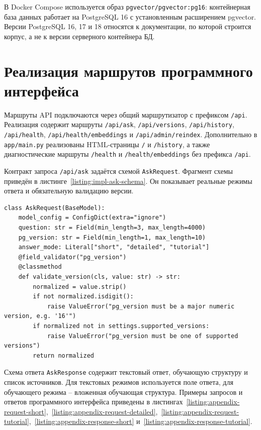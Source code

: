 В Docker Compose используется образ \texttt{pgvector/pgvector:pg16}: контейнерная база данных работает на PostgreSQL 16 с установленным расширением pgvector. Версии PostgreSQL 16, 17 и 18 относятся к документации, по которой строится корпус, а не к версии серверного контейнера БД.

\section{Реализация маршрутов программного интерфейса}

Маршруты API подключаются через общий маршрутизатор с префиксом \texttt{/api}. Реализация содержит маршруты \texttt{/api/ask}, \texttt{/api/versions}, \texttt{/api/history}, \texttt{/api/health}, \texttt{/api/health/embeddings} и \texttt{/api/admin/reindex}. Дополнительно в \texttt{app/main.py} реализованы HTML-страницы \texttt{/} и \texttt{/history}, а также диагностические маршруты \texttt{/health} и \texttt{/health/embeddings} без префикса \texttt{/api}.

Контракт запроса \texttt{/api/ask} задаётся схемой \texttt{AskRequest}. Фрагмент схемы приведён в листинге~\ref{listing:impl-ask-schema}. Он показывает реальные режимы ответа и обязательную валидацию версии.

\begin{listingblock}
\label{listing:impl-ask-schema}
\begin{verbatim}
class AskRequest(BaseModel):
    model_config = ConfigDict(extra="ignore")
    question: str = Field(min_length=3, max_length=4000)
    pg_version: str = Field(min_length=1, max_length=10)
    answer_mode: Literal["short", "detailed", "tutorial"]
    @field_validator("pg_version")
    @classmethod
    def validate_version(cls, value: str) -> str:
        normalized = value.strip()
        if not normalized.isdigit():
            raise ValueError("pg_version must be a major numeric version, e.g. '16'")
        if normalized not in settings.supported_versions:
            raise ValueError("pg_version must be one of supported versions")
        return normalized
\end{verbatim}
\end{listingblock}

Схема ответа \texttt{AskResponse} содержит текстовый ответ, обучающую структуру и список источников. Для текстовых режимов используется поле ответа, для обучающего режима -- вложенная обучающая структура. Примеры запросов и ответов программного интерфейса приведены в листингах~\ref{listing:appendix-request-short},~\ref{listing:appendix-request-detailed},~\ref{listing:appendix-request-tutorial},~\ref{listing:appendix-response-short} и~\ref{listing:appendix-response-tutorial}.

